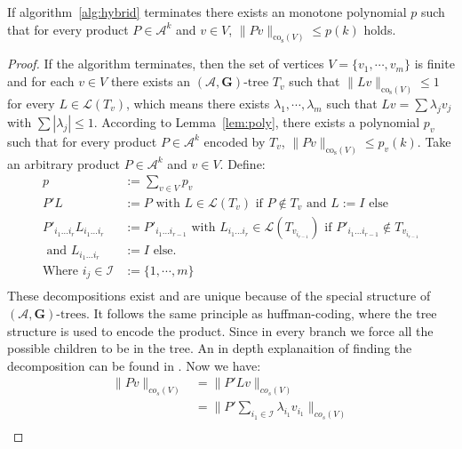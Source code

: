 \begin{lemma}
  \label{lem:arb.prod.bound}
  If algorithm~\ref{alg:hybrid} terminates there exists an monotone polynomial $p$ such that for every product $P \in \mathcal{A}^k$ and $v \in V$, $\lVert Pv \rVert _{\text{co}_{\text{s}}(V)} \le p(k)$ holds.
\end{lemma}

\begin{proof}
If the algorithm terminates, then the set of vertices $V = \{ v_1, \cdots, v_m \}$ is finite and for each $v \in V$ there exists an $(\mathcal{A},\mathbf{G})\text{-tree } T_v$ such that $\lVert Lv \rVert _{\text{co}_{\text{s}}(V)} \leq 1$ for every $L \in \mathcal{L}(T_v)$, which means there exists $\lambda_1, \cdots, \lambda_m$ such that $Lv = \sum \lambda_j v_j$ with $ \sum |\lambda_j| \leq 1 $. According to Lemma~\ref{lem:poly}, there exists a polynomial $p_v$ such that for every product $P \in \mathcal{A}^k$ encoded by $T_v$, $\lVert Pv \rVert _{\text{co}_{\text{s}}(V)} \leq p_v(k)$.
Take an arbitrary product $P \in \mathcal{A}^k$ and $v \in V$.
Define: 
$$
\begin{aligned}
  p & := \sum \limits_{v \in V} p_v \\
  P' L & := P \text{ with } L  \in  \mathcal{L}(T_v) \text{ if } P \notin T_v \text{ and } L  := I \text{ else}\\
  P'_{i_1 \dots i_r} L_{i_1 \dots i_r} & := P'_{i_1 \dots i_{r-1}} \text{ with } L_{i_1 \dots i_r} \in  \mathcal{L}(T_{v_{i_{r-1}}}) \text{ if } P'_{i_1 \dots i_{r-1}} \notin T_{v_{i_{r-1}}}\\
  \text{ and } L_{i_1 \dots i_r} & := I \text{ else.} \\
  \text{Where } i_j \in \mathcal{I} & := \{1, \cdots, m \}\\
\end{aligned}
$$
These decompositions exist and are unique because of the special structure of $(\mathcal{A},\mathbf{G})\text{-trees}$.
It follows the same principle as huffman-coding, where the tree structure is used to encode the product. Since in every branch we force all the possible children to be in the tree. An in depth explanaition of finding the decomposition can be found in \citep{mollerTreebasedApproachJoint2014}.
\newline
Now we have:
$$
\begin{aligned}
  \|Pv\|_{co_s(V)} & = \|P'Lv\|_{co_s(V)} \\ 
  & = \|P' \sum \limits_{i_1 \in \mathcal{I}} \lambda_{i_1} v_{i_1} \|_{co_s(V)} \\ 

\end{aligned}$$
\end{proof}
